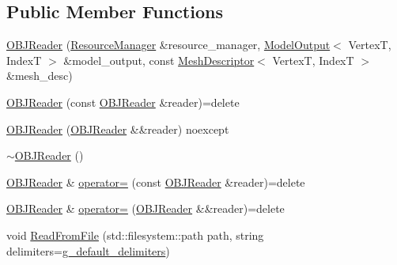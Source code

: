 \subsection*{Public Member Functions}
\begin{DoxyCompactItemize}
\item 
\mbox{\hyperlink{classmage_1_1rendering_1_1loader_1_1_o_b_j_reader_a5fe68a545e05c266b69f35e4dc9027a9}{O\+B\+J\+Reader}} (\mbox{\hyperlink{classmage_1_1rendering_1_1_resource_manager}{Resource\+Manager}} \&resource\+\_\+manager, \mbox{\hyperlink{structmage_1_1rendering_1_1_model_output}{Model\+Output}}$<$ VertexT, IndexT $>$ \&model\+\_\+output, const \mbox{\hyperlink{classmage_1_1rendering_1_1_mesh_descriptor}{Mesh\+Descriptor}}$<$ VertexT, IndexT $>$ \&mesh\+\_\+desc)
\item 
\mbox{\hyperlink{classmage_1_1rendering_1_1loader_1_1_o_b_j_reader_a1ba7402bf27180682de9109a3d0d031f}{O\+B\+J\+Reader}} (const \mbox{\hyperlink{classmage_1_1rendering_1_1loader_1_1_o_b_j_reader}{O\+B\+J\+Reader}} \&reader)=delete
\item 
\mbox{\hyperlink{classmage_1_1rendering_1_1loader_1_1_o_b_j_reader_afa0ab677916b17126aa4fc202c52684e}{O\+B\+J\+Reader}} (\mbox{\hyperlink{classmage_1_1rendering_1_1loader_1_1_o_b_j_reader}{O\+B\+J\+Reader}} \&\&reader) noexcept
\item 
\mbox{\hyperlink{classmage_1_1rendering_1_1loader_1_1_o_b_j_reader_a2b10c4cbb4c4aea192c78045beb4735e}{$\sim$\+O\+B\+J\+Reader}} ()
\item 
\mbox{\hyperlink{classmage_1_1rendering_1_1loader_1_1_o_b_j_reader}{O\+B\+J\+Reader}} \& \mbox{\hyperlink{classmage_1_1rendering_1_1loader_1_1_o_b_j_reader_a006549a7f9724580c7fdae2f7a9c7bdf}{operator=}} (const \mbox{\hyperlink{classmage_1_1rendering_1_1loader_1_1_o_b_j_reader}{O\+B\+J\+Reader}} \&reader)=delete
\item 
\mbox{\hyperlink{classmage_1_1rendering_1_1loader_1_1_o_b_j_reader}{O\+B\+J\+Reader}} \& \mbox{\hyperlink{classmage_1_1rendering_1_1loader_1_1_o_b_j_reader_ad35fe46e20179ce1cd79386501ee0959}{operator=}} (\mbox{\hyperlink{classmage_1_1rendering_1_1loader_1_1_o_b_j_reader}{O\+B\+J\+Reader}} \&\&reader)=delete
\item 
void \mbox{\hyperlink{classmage_1_1rendering_1_1loader_1_1_o_b_j_reader_ad4236487534d5dba6582613317317092}{Read\+From\+File}} (std\+::filesystem\+::path path, string delimiters=\mbox{\hyperlink{namespacemage_aa161198415efd9349da6187663250aea}{g\+\_\+default\+\_\+delimiters}})
\item 

\end{DoxyCompactItemize}

